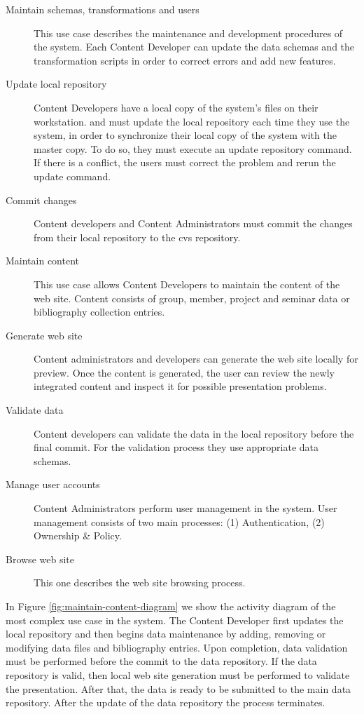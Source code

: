 \documentclass{elsart}
\begin{document}
\begin{description}
\item[Maintain schemas, transformations and users] This use case describes the 
maintenance and development procedures of the system. Each Content Developer can
update the data schemas and the transformation scripts in order to correct errors 
and add new features.

\item[Update local repository] Content Developers have a local copy of the system's files on their workstation. 
and must update the local repository each time they use the system, in order to synchronize their local copy of the system with the master copy. 
To do so, they must execute an update 
repository command. If there is a conflict, the users must correct the problem 
and rerun the update command.

\item[Commit changes] Content developers and Content Administrators must commit 
the changes from their local repository to the {\sc cvs} repository.

\item[Maintain content] This use case allows Content 
Developers to maintain the content of the web site. 
Content consists of group, member, project and seminar data or bibliography 
collection entries.

\item[Generate web site] Content administrators and developers can generate the 
web site locally for preview. Once the content is generated, 
the user can review the newly integrated content and inspect it
for possible presentation problems.

\item[Validate data] Content developers can validate the data in the local 
repository before the final commit. For the validation process
they use appropriate data schemas.

\item[Manage user accounts] Content Administrators perform user management in the 
system. User management consists of two main processes: 
(1) Authentication, (2) Ownership \& Policy.

\item[Browse web site] This one describes the web site browsing process.

\end{description} 

In Figure \ref{fig:maintain-content-diagram} we show the activity diagram of the 
most complex use case in the system. The Content Developer first updates the 
local repository and then begins data maintenance by adding, 
removing or modifying data files and bibliography entries. Upon completion, data 
validation must be performed before the commit to the data repository. If the data 
repository is valid, then local web site generation must be performed to validate the 
presentation. After that, the data is ready to be submitted to the main 
data repository. After the update of the data repository the process terminates.
\end{document}
